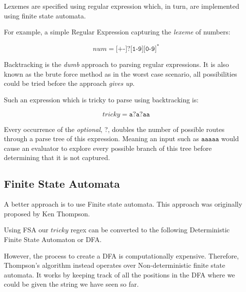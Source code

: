 \documentclass{article}
\renewcommand{\i}[1]{\textit{#1}}
\begin{document}
Lexemes are specified using regular expression which, in turn, are implemented using finite state automata.

For example, a simple Regular Expression capturing the \i{lexeme} of numbers:

$$
num = \texttt{[+-]?[1-9][0-9]}^\ast
$$

Backtracking is the \i{dumb} approach to parsing regular expressions. It is also known as the brute force method as in the worst case scenario, all possibilities could be tried before the approach \i{gives up}.

Such an expression which is tricky to parse using backtracking is:

$$
tricky = \texttt{a?a?aa}
$$

Every occurrence of the \i{optional}, ?, doubles the number of possible routes through a parse tree of this expression. Meaning an input such as $ \texttt{aaaaa}$ would cause an evaluator to explore every possible branch of this tree before determining that it is not captured.

\subsection{Finite State Automata}

A better approach is to use Finite state automata. This approach was originally proposed by Ken Thompson. 

Using FSA our $tricky$ regex can be converted to the following Deterministic Finite State Automaton or DFA. 
\begin{center}
\end{center}

However, the process to create a DFA is computationally expensive. Therefore, Thompson's algorithm instead operates over Non-deterministic finite state automata. It works by keeping track of all the positions in the DFA where we could be given the string we have seen so far.
\end{document}
